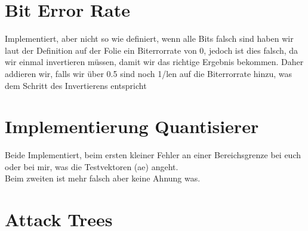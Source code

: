 \documentclass[12pt,a4paper]{article}
\begin{document}
\section{Bit Error Rate}
Implementiert, aber nicht so wie definiert, wenn alle Bits falsch sind haben wir laut der Definition auf der Folie ein Biterrorrate von 0, jedoch ist dies falsch, da wir einmal invertieren müssen, damit wir das richtige Ergebnis bekommen. Daher addieren wir, falls wir über 0.5 sind noch 1/len auf die Biterrorrate hinzu, was dem Schritt des Invertierens entspricht
\section{Implementierung Quantisierer}
Beide Implementiert, beim ersten kleiner Fehler an einer Bereichsgrenze bei euch oder bei mir, was die Testvektoren (ae) angeht.\\
Beim zweiten ist mehr falsch aber keine Ahnung was.
\section{Attack Trees}
\end{document}
